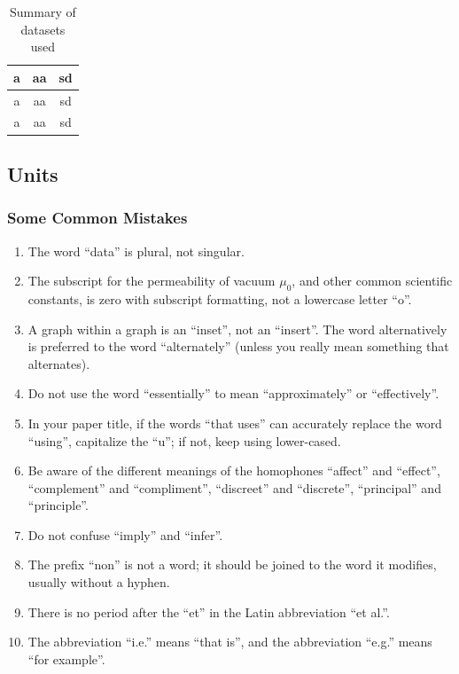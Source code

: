 \documentclass{article} %
\begin{document}
\begin{multicols}{2}
\begin{table}[H]
	\centering
	\caption{\footnotesize{Summary of datasets used}}
	\begin{tabular}{|c|c|c|}
	
		\hline
		
		a & aa & sd \\\hline
		a & aa & sd \\\hline
		a & aa & sd \\\hline
		
	\end{tabular}
	
	\label{tab:veris}
\end{table}

\subsection{Units}

\subsubsection{ Some Common Mistakes}

\begin{enumerate}
\item \textit{ }The word ``data'' is plural, not singular.
\item  The subscript for the permeability of vacuum ${\mu}_{0}$, and other common scientific constants, is zero with subscript formatting, not a lowercase letter ``o''.
\item  A graph within a graph is an ``inset'', not an ``insert''. The word alternatively is preferred to the word ``alternately'' (unless you really mean something that alternates).
\item  Do not use the word ``essentially'' to mean ``approximately'' or ``effectively''.
\item  In your paper title, if the words ``that uses'' can accurately replace the word ``using'', capitalize the ``u''; if not, keep using lower-cased.
\item  Be aware of the different meanings of the homophones ``affect'' and ``effect'', ``complement'' and ``compliment'', ``discreet'' and ``discrete'', ``principal'' and ``principle''.
\item  Do not confuse ``imply'' and ``infer''.
\item  The prefix ``non'' is not a word; it should be joined to the word it modifies, usually without a hyphen.
\item  There is no period after the ``et'' in the Latin abbreviation ``et al.''.
\item  The abbreviation ``i.e.'' means ``that is'', and the abbreviation ``e.g.'' means ``for example''.
\end{enumerate}



\end{multicols}
\end{document}

